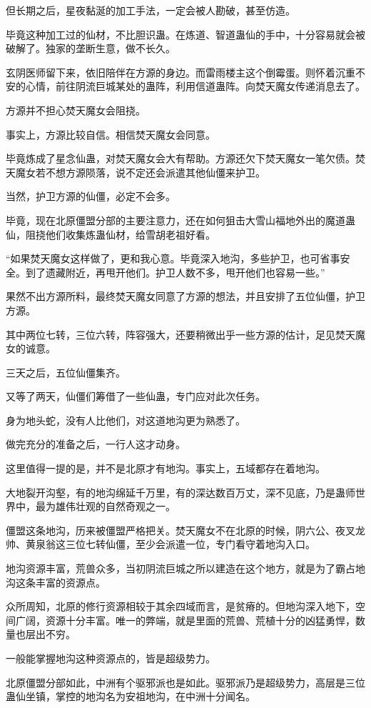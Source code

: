 \begin{this_body}
但长期之后，星夜黏涎的加工手法，一定会被人勘破，甚至仿造。

毕竟这种加工过的仙材，不比胆识蛊。在炼道、智道蛊仙的手中，十分容易就会被破解了。独家的垄断生意，做不长久。

玄阴医师留下来，依旧陪伴在方源的身边。而雷雨楼主这个倒霉蛋。则怀着沉重不安的心情，前往阴流巨城某处的蛊阵，利用信道蛊阵。向焚天魔女传递消息去了。

方源并不担心焚天魔女会阻挠。

事实上，方源比较自信。相信焚天魔女会同意。

毕竟炼成了星念仙蛊，对焚天魔女会大有帮助。方源还欠下焚天魔女一笔欠债。焚天魔女若不想方源陨落，说不定还会派遣其他仙僵来护卫。

当然，护卫方源的仙僵，必定不会多。

毕竟，现在北原僵盟分部的主要注意力，还在如何狙击大雪山福地外出的魔道蛊仙，阻挠他们收集炼蛊仙材，给雪胡老祖好看。

“如果焚天魔女这样做了，更和我心意。毕竟深入地沟，多些护卫，也可省事安全。到了遗藏附近，再甩开他们。护卫人数不多，甩开他们也容易一些。”

果然不出方源所料，最终焚天魔女同意了方源的想法，并且安排了五位仙僵，护卫方源。

其中两位七转，三位六转，阵容强大，还要稍微出乎一些方源的估计，足见焚天魔女的诚意。

三天之后，五位仙僵集齐。

又等了两天，仙僵们筹借了一些仙蛊，专门应对此次任务。

身为地头蛇，没有人比他们，对这道地沟更为熟悉了。

做完充分的准备之后，一行人这才动身。

这里值得一提的是，并不是北原才有地沟。事实上，五域都存在着地沟。

大地裂开沟壑，有的地沟绵延千万里，有的深达数百万丈，深不见底，乃是蛊师世界中，最为雄伟壮观的自然奇观之一。

僵盟这条地沟，历来被僵盟严格把关。焚天魔女不在北原的时候，阴六公、夜叉龙帅、黄泉翁这三位七转仙僵，至少会派遣一位，专门看守着地沟入口。

地沟资源丰富，荒兽众多，当初阴流巨城之所以建造在这个地方，就是为了霸占地沟这条丰富的资源点。

众所周知，北原的修行资源相较于其余四域而言，是贫瘠的。但地沟深入地下，空间广阔，资源十分丰富。唯一的弊端，就是里面的荒兽、荒植十分的凶猛勇悍，数量也层出不穷。

一般能掌握地沟这种资源点的，皆是超级势力。

北原僵盟分部如此，中洲有个驱邪派也是如此。驱邪派乃是超级势力，高层是三位蛊仙坐镇，掌控的地沟名为安祖地沟，在中洲十分闻名。


\end{this_body}
